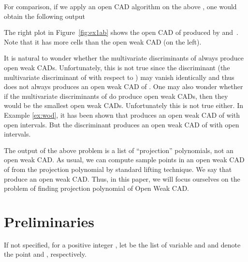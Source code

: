 \documentclass[amsthm]{elsart}
\begin{document}
\begin{rem} For comparison, if we apply an open CAD  algorithm on the above , one would obtain the following
output\medskip
\begin{description}[leftmargin=3em,style=nextline,itemsep=0.5em]
\item[\sf Out:]  
\item[]          
\end{description}  \medskip
The right plot in Figure~\ref{fig:ex1ab} shows the open  CAD of   produced by  and~.
Note that it has more cells than the open weak CAD (on the left).
\end{rem}


\begin{rem}
It is natural to wonder whether the multivariate discriminants of  always produce open weak CADs. Unfortunately, this is not true since the discriminant  (the multivariate discriminant of  with respect to ) may vanish identically and thus does not always produces an open weak CAD of .
One may also wonder whether if the multivariate discriminants of  do produce open weak CADs, then they would be the smallest open weak CADs. Unfortunately this is not true  either. In Example \ref{ex:wod}, it has been shown that  produces an open weak CAD of  with  open intervals. But the discriminant  produces an open weak CAD of  with  open intervals.
\end{rem}

\begin{rem}
The output of the above problem is a list of ``projection'' polynomials, not an open weak CAD. As usual, we can compute sample points in an open weak CAD of  from the projection polynomial  by standard lifting technique. We say that  produce an open weak CAD. Thus, in this paper, we will focus ourselves on the problem of finding projection polynomial of Open Weak CAD.
\end{rem}














\section{Preliminaries}\label{sec:pre}
If not specified, for a positive integer , let  be the list of variable  and  and  denote the point  and , respectively.
\end{document}
